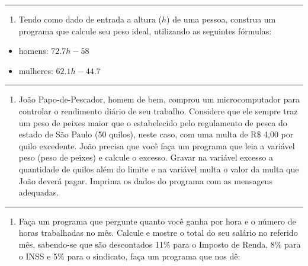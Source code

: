 \documentclass[12pt,a4paper]{article}
\providecommand{\tightlist}{%
      \setlength{\itemsep}{0pt}\setlength{\parskip}{0pt}}
\begin{document}
    \begin{center}\rule{0.5\linewidth}{0.5pt}\end{center}

\begin{enumerate}
\def\labelenumi{\arabic{enumi}.}
\setcounter{enumi}{6}
\tightlist
\item
  Tendo como dado de entrada a altura (\(h\)) de uma pessoa, construa um
  programa que calcule seu peso ideal, utilizando as seguintes fórmulas:
\end{enumerate}

\begin{itemize}
\tightlist
\item
  homens: \(72.7h - 58\)
\item
  mulheres: \(62.1h - 44.7\)
\end{itemize}

    \begin{center}\rule{0.5\linewidth}{0.5pt}\end{center}

\begin{enumerate}
\def\labelenumi{\arabic{enumi}.}
\setcounter{enumi}{7}
\tightlist
\item
  João Papo-de-Pescador, homem de bem, comprou um microcomputador para
  controlar o rendimento diário de seu trabalho. Considere que ele
  sempre traz um peso de peixes maior que o estabelecido pelo
  regulamento de pesca do estado de São Paulo (50 quilos), neste caso,
  com uma multa de R\$ 4,00 por quilo excedente. João precisa que você
  faça um programa que leia a variável peso (peso de peixes) e calcule o
  excesso. Gravar na variável excesso a quantidade de quilos além do
  limite e na variável multa o valor da multa que João deverá pagar.
  Imprima os dados do programa com as mensagens adequadas.
\end{enumerate}

    \begin{center}\rule{0.5\linewidth}{0.5pt}\end{center}

\begin{enumerate}
\def\labelenumi{\arabic{enumi}.}
\setcounter{enumi}{8}
\tightlist
\item
  Faça um programa que pergunte quanto você ganha por hora e o número de
  horas trabalhadas no mês. Calcule e mostre o total do seu salário no
  referido mês, sabendo-se que são descontados 11\% para o Imposto de
  Renda, 8\% para o INSS e 5\% para o sindicato, faça um programa que
  nos dê:
\end{enumerate}
\end{document}

